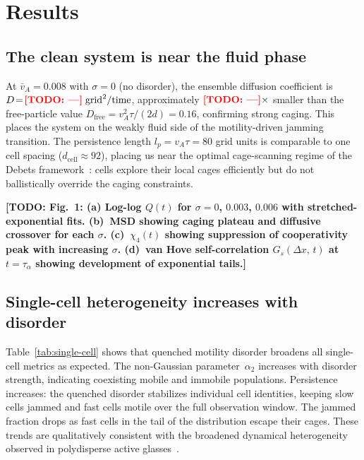 \documentclass[aps,pre,twocolumn,superscriptaddress,longbibliography,floatfix]{revtex4-2}
\newcommand{\TODO}[1]{{\color{red}\textbf{[TODO: #1]}}}
\begin{document}
\section{Results}
\label{sec:results}

\subsection{The clean system is near the fluid phase}

At $\bar{v}_A=0.008$ with $\sigma=0$ (no disorder), the ensemble
diffusion coefficient is
$D\!=\!\TODO{---}\;\mathrm{grid}^2/\mathrm{time}$, approximately
$\TODO{---}\times$ smaller than the free-particle value
$D_{\mathrm{free}} = v_A^2\tau/(2d) = 0.16$, confirming strong
caging.  This places the system on the weakly fluid side of the
motility-driven jamming transition.  The persistence length
$l_p = v_A\tau = 80$ grid units is comparable to one cell spacing
($d_{\mathrm{cell}}\!\approx\!92$), placing us near the optimal
cage-scanning regime of the Debets framework~\cite{debets2021}: cells
explore their local cages efficiently but do not ballistically override
the caging constraints.

\TODO{Fig.~1: (a) Log-log $Q(t)$ for $\sigma=0$, $0.003$, $0.006$ with
stretched-exponential fits.  (b)~MSD showing caging plateau and
diffusive crossover for each $\sigma$.  (c)~$\chi_4(t)$ showing
suppression of cooperativity peak with increasing $\sigma$.  (d)~van
Hove self-correlation $G_s(\Delta x,\,t)$ at $t\!=\!\tau_\alpha$
showing development of exponential tails.}

\subsection{Single-cell heterogeneity increases with disorder}

Table~\ref{tab:single-cell} shows that quenched motility disorder
broadens all single-cell metrics as expected.  The non-Gaussian
parameter~$\alpha_2$ increases with disorder strength,
indicating coexisting
mobile and immobile populations.  Persistence increases: the quenched
disorder stabilizes individual cell identities,
keeping slow cells jammed and fast cells motile over the full
observation window.  The jammed fraction drops as
fast cells in the tail of the distribution escape their cages.  These
trends are qualitatively consistent with the broadened dynamical
heterogeneity observed in polydisperse active
glasses~\cite{keta2022}.
\end{document}
